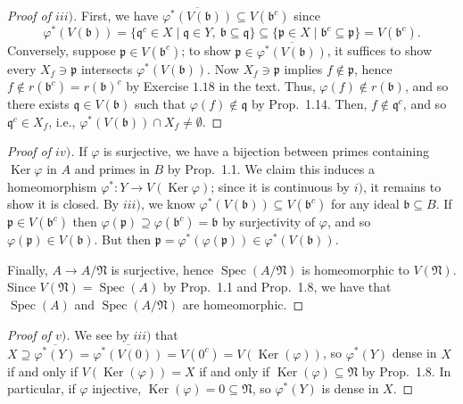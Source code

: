 \documentclass[12pt,letterpaper]{article}
\theoremstyle{definition}
\theoremstyle{remark}
\numberwithin{figure}{problem}
\numberwithin{equation}{section}
\DeclareMathOperator{\Spec}{Spec}
\DeclareMathOperator{\Ker}{Ker}
\begin{document}
\begin{proof}[Proof of $iii)$]
  First, we have $\overline{\varphi^*\left( V(\mathfrak{b}) \right)} \subseteq V(\mathfrak{b}^c)$ since
  \begin{equation*}
    \varphi^*( V(\mathfrak{b})) = \{\mathfrak{q}^c \in X \mid \mathfrak{q} \in Y,\ \mathfrak{b} \subseteq \mathfrak{q}\} \subseteq \{\mathfrak{p} \in X \mid \mathfrak{b}^c \subseteq \mathfrak{p}\} = V(\mathfrak{b}^c).
  \end{equation*}
  Conversely, suppose $\mathfrak{p} \in V(\mathfrak{b}^c)$; to show $\mathfrak{p} \in \overline{\varphi^*\left( V(\mathfrak{b}) \right)}$, it suffices to show every $X_f \ni \mathfrak{p}$ intersects $\varphi^*\left( V(\mathfrak{b}) \right)$. Now $X_f \ni \mathfrak{p}$ implies $f \notin \mathfrak{p}$, hence $f \notin r(\mathfrak{b}^c) = r(\mathfrak{b})^c$ by Exercise $1.18$ in the text. Thus, $\varphi(f) \notin r(\mathfrak{b})$, and so there exists $\mathfrak{q} \in V(\mathfrak{b})$ such that $\varphi(f) \notin \mathfrak{q}$ by Prop.~1.14. Then, $f \notin \mathfrak{q}^c$, and so $\mathfrak{q}^c \in X_f$, i.e., $\varphi^*(V(\mathfrak{b})) \cap X_f \ne \emptyset$.
\end{proof}
\begin{proof}[Proof of $iv)$]
  If $\varphi$ is surjective, we have a bijection between primes containing $\Ker\varphi$ in $A$ and primes in $B$ by Prop.~1.1. We claim this induces a homeomorphism $\varphi^*\colon Y \to V(\Ker\varphi)$; since it is continuous by $i)$, it remains to show it is closed. By $iii)$, we know $\varphi^*(V(\mathfrak{b})) \subseteq V(\mathfrak{b}^c)$ for any ideal $\mathfrak{b} \subseteq B$. If $\mathfrak{p} \in V(\mathfrak{b}^c)$ then $\varphi(\mathfrak{p}) \supseteq \varphi(\mathfrak{b}^c) = \mathfrak{b}$ by surjectivity of $\varphi$, and so $\varphi(\mathfrak{p}) \in V(\mathfrak{b})$. But then $\mathfrak{p} = \varphi^*(\varphi(\mathfrak{p})) \in \varphi^*(V(\mathfrak{b}))$.
  \par Finally, $A \to A/\mathfrak{N}$ is surjective, hence $\Spec(A/\mathfrak{N})$ is homeomorphic to $V(\mathfrak{N})$. Since $V(\mathfrak{N})=\Spec(A)$ by Prop.~1.1 and Prop.~1.8, we have that $\Spec(A)$ and $\Spec(A/\mathfrak{N})$ are homeomorphic.
\end{proof}
\begin{proof}[Proof of $v)$]
  We see by $iii)$ that $X \supseteq \overline{\varphi^*(Y)} = \overline{\varphi^*(V(0))} = V(0^c) = V(\Ker(\varphi))$, so $\varphi^*(Y)$ dense in $X$ if and only if $V(\Ker(\varphi)) = X$ if and only if $\Ker(\varphi) \subseteq \mathfrak{N}$ by Prop.~1.8. In particular, if $\varphi$ injective, $\Ker(\varphi) = 0 \subseteq \mathfrak{N}$, so $\varphi^*(Y)$ is dense in $X$.
\end{proof}
\end{document}
